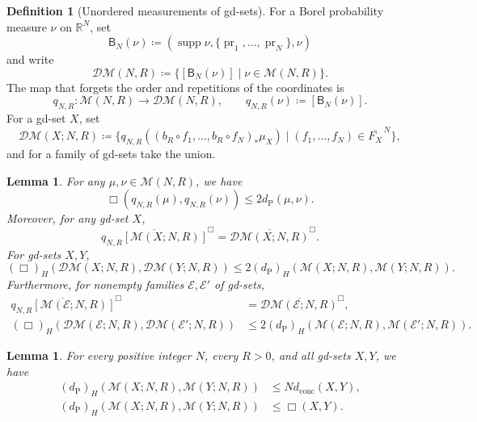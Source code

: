 \documentclass{amsart}
\theoremstyle{plain}
\newtheorem{lemma}[theorem]{Lemma}
\theoremstyle{definition}
\newtheorem*{definition*}{Definition}
\theoremstyle{remark}
\newcommand{\R}{\mathbb{R}}
\newcommand{\M}{\mathcal{M}}
\newcommand{\DM}{\mathcal{DM}}
\DeclareMathOperator{\supp}{supp}
\DeclareMathOperator{\pr}{pr}
\newcommand{\dconc}{d_{\operatorname{conc}}}
\newcommand{\dpr}{d_{\operatorname{P}}}
\newcommand{\haus}[1]{\left(#1\right)_H}
\begin{document}
\begin{definition*}[Unordered measurements of gd-sets]
For a Borel probability measure $\nu$ on $\R^N$, set
\[\mathsf B_N(\nu)\coloneqq(\supp\nu,\{\pr_1,\ldots,\pr_N\},\nu)\]
and write
\[\DM(N,R)\coloneqq\{[\mathsf B_N(\nu)]\mid\nu\in\M(N,R)\}.\]
The map that forgets the order and repetitions of the coordinates is
\[
q_{N,R}\colon\M(N,R)\longrightarrow\DM(N,R),\qquad
q_{N,R}(\nu)\coloneqq[\mathsf B_N(\nu)].
\]
For a gd-set $X$, set
\[
\DM(X;N,R)\coloneqq\{q_{N,R}((b_R\circ f_1,\ldots,b_R\circ f_N)_*\mu_X)\mid(f_1,\ldots,f_N)\in\overline{F_X}^{\,N}\},
\]
and for a family of gd-sets take the union.
\end{definition*}

\begin{lemma}
\label{lem:ordered-to-feature-measurement}
For any $\mu,\nu\in\M(N,R)$, we have
\[\Box(q_{N,R}(\mu),q_{N,R}(\nu))\leq2\dpr(\mu,\nu).\]
Moreover, for any gd-set $X$,
\begin{equation}
\label{eq:ordered-feature-closure}
\overline{q_{N,R}[\M(X;N,R)]}^{\Box}=\overline{\DM(X;N,R)}^{\Box}.
\end{equation}
For gd-sets $X,Y$,
\begin{equation}
\label{eq:ordered-controls-feature}
\haus{\Box}(\DM(X;N,R),\DM(Y;N,R))
\leq2\haus{\dpr}(\M(X;N,R),\M(Y;N,R)).
\end{equation}
Furthermore, for nonempty families $\mathcal E,\mathcal E'$ of gd-sets,
\begin{align}
\overline{q_{N,R}[\M(\mathcal E;N,R)]}^{\Box}
&=\overline{\DM(\mathcal E;N,R)}^{\Box},\label{eq:family-measurement-closure}\\
\haus{\Box}(\DM(\mathcal E;N,R),\DM(\mathcal E';N,R))
&\leq2\haus{\dpr}(\M(\mathcal E;N,R),\M(\mathcal E';N,R)).\label{eq:family-measurement-comparison}
\end{align}
\end{lemma}

\begin{lemma}
\label{lem:general-ordered-measurement-stability}
For every positive integer $N$, every $R>0$, and all gd-sets $X,Y$, we have
\begin{align}
\haus{\dpr}(\M(X;N,R),\M(Y;N,R))&\leq N\dconc(X,Y),\label{eq:general-dconc-controls-ordered}\\
\haus{\dpr}(\M(X;N,R),\M(Y;N,R))&\leq\Box(X,Y).\label{eq:general-box-controls-ordered}
\end{align}
\end{lemma}
\end{document}
